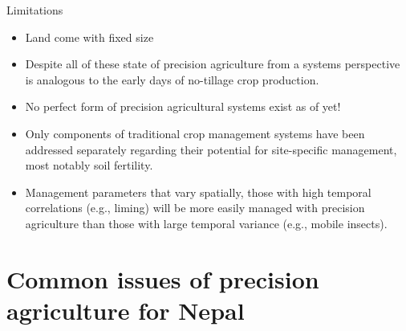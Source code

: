 \documentclass[11pt,dvipsnames,ignorenonframetext,aspectratio=169]{beamer}
\providecommand{\tightlist}{%
  \setlength{\itemsep}{0pt}\setlength{\parskip}{0pt}}
\begin{document}
\begin{frame}{Limitations}
\protect\hypertarget{limitations}{}
\begin{itemize}
\tightlist
\item
  Land come with fixed size
\item
  Despite all of these state of precision agriculture from a systems
  perspective is analogous to the early days of no-tillage crop
  production.
\item
  No perfect form of precision agricultural systems exist as of yet!
\item
  Only components of traditional crop management systems have been
  addressed separately regarding their potential for site-specific
  management, most notably soil fertility.
\item
  Management parameters that vary spatially, those with high temporal
  correlations (e.g., liming) will be more easily managed with precision
  agriculture than those with large temporal variance (e.g., mobile
  insects).
\end{itemize}
\end{frame}

\hypertarget{common-issues-of-precision-agriculture-for-nepal}{%
\section{Common issues of precision agriculture for
Nepal}\label{common-issues-of-precision-agriculture-for-nepal}}
\end{document}

